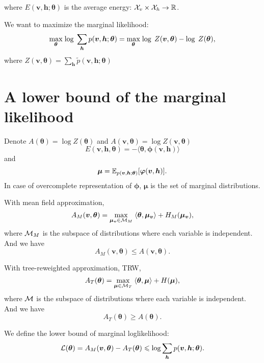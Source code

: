 where $E(\bm{v}, \bm{h}; \bm{\theta})$ is the average energy: $\mathcal{X}_v \times \mathcal{X}_h \rightarrow \mathbb{R}$.

We want to maximize the marginal likelihood:
\begin{equation}
  \underset{\bm{\theta}}{\max}\;{\log\;\sum_{\bm{h}}p(\bm{v}, \bm{h}; \bm{\theta})} = \underset{\bm{\theta}}{\max}\;{\log\;Z(\bm{v}, \bm{\theta})} - \log\; Z(\bm{\theta}), 
\end{equation}
where $Z(\bm{v}, \bm{\theta})  = \sum_{\bm{h}}\tilde{p}(\bm{v}, \bm{h} ; \bm{\theta})$
\section{A lower bound of the marginal likelihood}
Denote $A(\bm{\theta}) = \log{Z(\bm{\theta})}$ and $A(\bm{v}, \bm{\theta}) = \log{Z(\bm{v}, \bm{\theta})}$
\begin{equation}
  E(\bm{v}, \bm{h}, \bm{\theta}) = - \langle  \bm{\theta}, \bm{\phi}(\bm{v}, \bm{h})\rangle
\end{equation}
and
\begin{equation}
  \bm{\mu} = \mathbb{E}_{p(\bm{v}, \bm{h}; \bm{\theta})}[\bm{\varphi}(\bm{v}, \bm{h})].
\end{equation}
In case of overcomplete representation of $\bm{\phi}$, $\bm{\mu}$ is the set of marginal distributions.


With mean field approximation,
\begin{equation}
  A_{M}(\bm{v}, \bm{\theta}) = \underset{\bm{\mu}_{\bm{v}} \in \mathcal{M}_M}{\max}\;{ \langle {\bm{\theta}, \bm{\mu}_{\bm{v}}} \rangle + H_{M}(\bm{\mu}_{\bm{v}})},
\end{equation}
where $\mathcal{M}_M$ is the subspace of distributions where each variable is independent. And we have
\begin{equation}
  A_{M}(\bm{v}, \bm{\theta}) \leq A(\bm{v}, \bm{\theta}).
\end{equation}

With tree-reweighted approximation, TRW,
\begin{equation}
  A_{T}(\bm{\theta}) = \underset{\bm{\mu} \in \mathcal{M}_T}{\max}\;{ \langle {\bm{\theta}, \bm{\mu}} \rangle + H(\bm{\mu})},
\end{equation}
where $\mathcal{M}$ is the subspace of distributions where each variable is independent. And we have
\begin{equation}
  A_{T}(\bm{\theta}) \geq A( \bm{\theta}).
\end{equation}

We define the lower bound of marginal loglikelihood:
\begin{equation}
  \mathcal{L}(\bm{\theta}) = A_{M}(\bm{v}, \bm{\theta}) - A_{T}(\bm{\theta}) \leqslant \log\sum_{\bm{h}}p(\bm{v}, \bm{h}; \bm{\theta}).
\end{equation}

